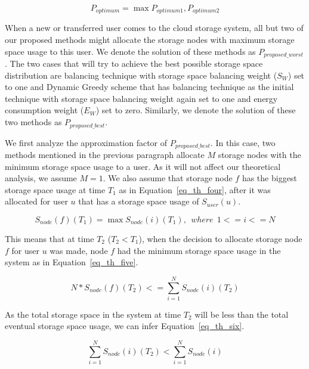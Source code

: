 \documentclass[preprint,12pt]{elsarticle}
\begin{document}
\begin{equation}
P_{optimum} = \max{P_{optimum1}, P_{optimum2}}
\label{eq_th_three}
\end{equation}
\hfill

When a new or transferred user comes to the cloud storage system, all but two of our proposed
methods might allocate the storage nodes with maximum storage space usage to this user.
We denote the solution of these methods as $P_{proposed\_worst}$. The two cases that will try
to achieve the best possible storage space distribution are balancing technique with storage
space balancing weight ($S_W$) set to one and Dynamic Greedy scheme that has balancing technique
as the initial technique with storage space balancing weight again set to one and energy consumption
weight ($E_W$) set to zero. Similarly, we denote the solution of these two methods as $P_{proposed\_best}$.

We first analyze the approximation factor of $P_{proposed\_best}$. In this case, two methods
mentioned in the previous paragraph allocate $M$ storage nodes with the minimum storage space usage
to a user. As it will not affect our theoretical analysis, we assume $ M = 1 $. We also assume that
storage node $f$ has the biggest storage space usage at time $T_1$ as in Equation~\eqref{eq_th_four}, after
it was allocated for user $u$ that has a storage space usage of $S_{user}(u)$.

\begin{equation}
S_{node}(f)(T_1) = \max{S_{node}(i)(T_1)},\ \ where\ \ 1 <= i <= N
\label{eq_th_four}
\end{equation}
\hfill

This means that at time $T_2$ ($T_2 < T_1$), when the decision to allocate storage node $f$ for
user $u$ was made, node $f$ had the minimum storage space usage in the system as in Equation~\eqref{eq_th_five}.

\begin{equation}
N * S_{node}(f)(T_2) <= \sum\limits_{i=1}^{N}S_{node}(i)(T_2)
\label{eq_th_five}
\end{equation}
\hfill

As the total storage space in the system at time $T_2$ will be less than the total eventual storage
space usage, we can infer Equation~\eqref{eq_th_six}.

\begin{equation}
\sum\limits_{i=1}^{N}S_{node}(i)(T_2) < \sum\limits_{i=1}^{N}S_{node}(i)
\label{eq_th_six}
\end{equation}
\hfill
\end{document}
